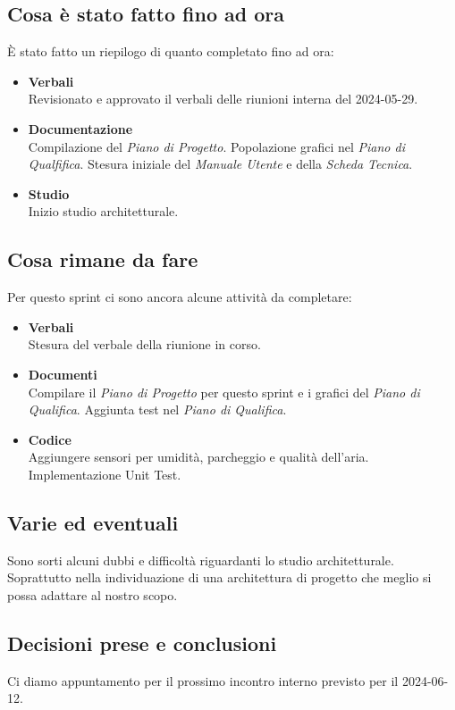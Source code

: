 \documentclass[italian,12pt]{article}
\begin{document}
\subsection{Cosa è stato fatto fino ad ora}
È stato fatto un riepilogo di quanto completato fino ad ora:
\begin{itemize}
	\item \textbf{Verbali} \\
	      Revisionato e approvato il verbali delle riunioni interna del 2024-05-29.
	\item \textbf{Documentazione} \\
	      Compilazione del \textit{Piano di Progetto}. Popolazione grafici nel \textit{Piano di Qualfifica}. Stesura iniziale del \textit{Manuale Utente} e della \textit{Scheda Tecnica}.
	\item \textbf{Studio} \\
		  Inizio studio architetturale.
\end{itemize}

\subsection{Cosa rimane da fare}
Per questo sprint ci sono ancora alcune attività da completare:
\begin{itemize}
	\item \textbf{Verbali} \\
		  Stesura del verbale della riunione in corso.
	\item \textbf{Documenti} \\
		  Compilare il \textit{Piano di Progetto} per questo sprint e i grafici del \textit{Piano di Qualifica}. Aggiunta test nel \textit{Piano di Qualifica}.  
	\item \textbf{Codice} \\
		  Aggiungere sensori per umidità, parcheggio e qualità dell'aria. Implementazione Unit Test.
\end{itemize}

\subsection{Varie ed eventuali}
Sono sorti alcuni dubbi e difficoltà riguardanti lo studio architetturale. Soprattutto nella individuazione di una architettura di progetto che meglio si possa adattare al nostro scopo.

\subsection{Decisioni prese e conclusioni}
Ci diamo appuntamento per il prossimo incontro interno previsto per il 2024-06-12.
\end{document}

